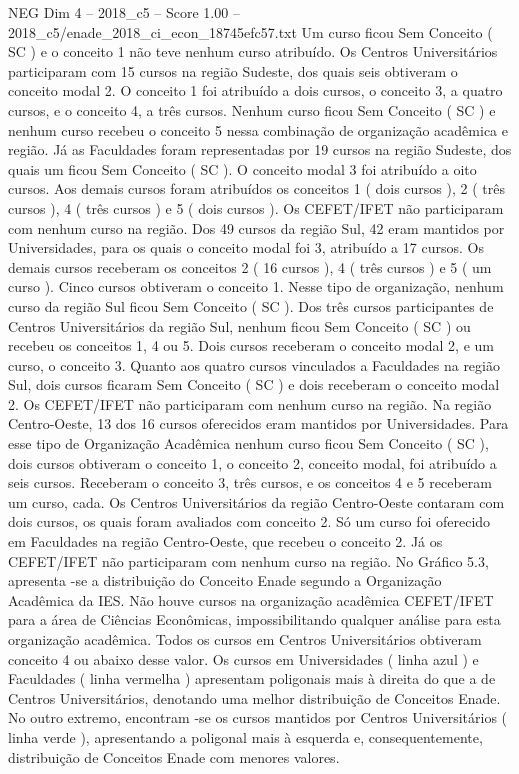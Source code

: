 \begin{textsample}{NEG Dim 4 – 2018\_c5 – Score 1.00 – 2018\_c5/enade\_2018\_ci\_econ\_18745efc57.txt}
Um curso ficou Sem Conceito ( SC ) e o conceito 1 não teve nenhum curso atribuído.
Os Centros Universitários participaram com 15 cursos na região Sudeste, dos quais seis obtiveram o conceito modal 2.
O conceito 1 foi atribuído a dois cursos, o conceito 3, a quatro cursos, e o conceito 4, a três cursos.
Nenhum curso ficou Sem Conceito ( SC ) e nenhum curso recebeu o conceito 5 nessa combinação de organização acadêmica e região.
Já as Faculdades foram representadas por 19 cursos na região Sudeste, dos quais um ficou Sem Conceito ( SC ).
O conceito modal 3 foi atribuído a oito cursos.
Aos demais cursos foram atribuídos os conceitos 1 ( dois cursos ), 2 ( três cursos ), 4 ( três cursos ) e 5 ( dois cursos ).
Os CEFET/IFET não participaram com nenhum curso na região.
Dos 49 cursos da região Sul, 42 eram mantidos por Universidades, para os quais o conceito modal foi 3, atribuído a 17 cursos.
Os demais cursos receberam os conceitos 2 ( 16 cursos ), 4 ( três cursos ) e 5 ( um curso ).
Cinco cursos obtiveram o conceito 1.
Nesse tipo de organização, nenhum curso da região Sul ficou Sem Conceito ( SC ).
Dos três cursos participantes de Centros Universitários da região Sul, nenhum ficou Sem Conceito ( SC ) ou recebeu os conceitos 1, 4 ou 5.
Dois cursos receberam o conceito modal 2, e um curso, o conceito 3.
Quanto aos quatro cursos vinculados a Faculdades na região Sul, dois cursos ficaram Sem Conceito ( SC ) e dois receberam o conceito modal 2.
Os CEFET/IFET não participaram com nenhum curso na região.
Na região Centro-Oeste, 13 dos 16 cursos oferecidos eram mantidos por Universidades.
Para esse tipo de Organização Acadêmica nenhum curso ficou Sem Conceito ( SC ), dois cursos obtiveram o conceito 1, o conceito 2, conceito modal, foi atribuído a seis cursos.
Receberam o conceito 3, três cursos, e os conceitos 4 e 5 receberam um curso, cada.
Os Centros Universitários da região Centro-Oeste contaram com dois cursos, os quais foram avaliados com conceito 2.
Só um curso foi oferecido em Faculdades na região Centro-Oeste, que recebeu o conceito 2.
Já os CEFET/IFET não participaram com nenhum curso na região.
No Gráfico 5.3, apresenta -se a distribuição do Conceito Enade segundo a Organização Acadêmica da IES.
Não houve cursos na organização acadêmica CEFET/IFET para a área de Ciências Econômicas, impossibilitando qualquer análise para esta organização acadêmica.
Todos os cursos em Centros Universitários obtiveram conceito 4 ou abaixo desse valor.
Os cursos em Universidades ( linha azul ) e Faculdades ( linha vermelha ) apresentam poligonais mais à direita do que a de Centros Universitários, denotando uma melhor distribuição de Conceitos Enade.
No outro extremo, encontram -se os cursos mantidos por Centros Universitários ( linha verde ), apresentando a poligonal mais à esquerda e, consequentemente, distribuição de Conceitos Enade com menores valores.

\end{textsample}
